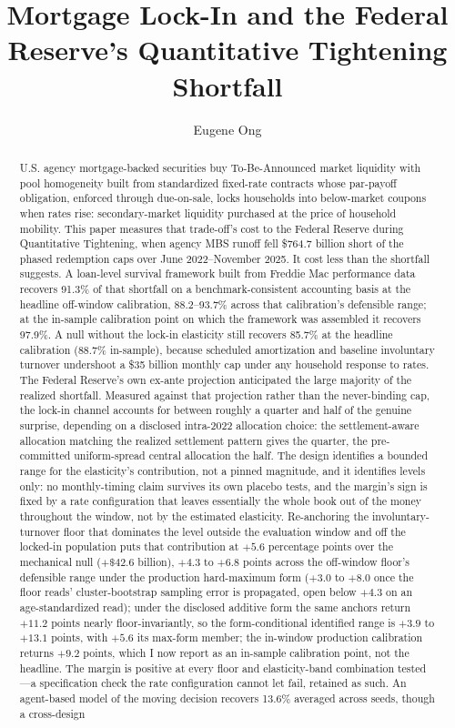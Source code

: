 \documentclass[12pt]{article}
\title{Mortgage Lock-In and the Federal Reserve's Quantitative Tightening Shortfall}
\author{Eugene Ong}
\affil{Carnegie Mellon University}
\date{}
\begin{document}
\maketitle
\begin{abstract}
\noindent U.S. agency mortgage-backed securities buy To-Be-Announced market liquidity with pool homogeneity built from standardized fixed-rate contracts whose par-payoff obligation, enforced through due-on-sale, locks households into below-market coupons when rates rise: secondary-market liquidity purchased at the price of household mobility. This paper measures that trade-off's cost to the Federal Reserve during Quantitative Tightening, when agency MBS runoff fell \$764.7 billion short of the phased redemption caps over June 2022--November 2025. It cost less than the shortfall suggests. A loan-level survival framework built from Freddie Mac performance data recovers 91.3\% of that shortfall on a benchmark-consistent accounting basis at the headline off-window calibration, 88.2--93.7\% across that calibration's defensible range; at the in-sample calibration point on which the framework was assembled it recovers 97.9\%. A null without the lock-in elasticity still recovers 85.7\% at the headline calibration (88.7\% in-sample), because scheduled amortization and baseline involuntary turnover undershoot a \$35 billion monthly cap under any household response to rates. The Federal Reserve's own ex-ante projection anticipated the large majority of the realized shortfall. Measured against that projection rather than the never-binding cap, the lock-in channel accounts for between roughly a quarter and half of the genuine surprise, depending on a disclosed intra-2022 allocation choice: the settlement-aware allocation matching the realized settlement pattern gives the quarter, the pre-committed uniform-spread central allocation the half. The design identifies a bounded range for the elasticity's contribution, not a pinned magnitude, and it identifies levels only: no monthly-timing claim survives its own placebo tests, and the margin's sign is fixed by a rate configuration that leaves essentially the whole book out of the money throughout the window, not by the estimated elasticity. Re-anchoring the involuntary-turnover floor that dominates the level outside the evaluation window and off the locked-in population puts that contribution at $+5.6$ percentage points over the mechanical null ($+\$42.6$ billion), $+4.3$ to $+6.8$ points across the off-window floor's defensible range under the production hard-maximum form ($+3.0$ to $+8.0$ once the floor reads' cluster-bootstrap sampling error is propagated, open below $+4.3$ on an age-standardized read); under the disclosed additive form the same anchors return $+11.2$ points nearly floor-invariantly, so the form-conditional identified range is $+3.9$ to $+13.1$ points, with $+5.6$ its max-form member; the in-window production calibration returns $+9.2$ points, which I now report as an in-sample calibration point, not the headline. The margin is positive at every floor and elasticity-band combination tested---a specification check the rate configuration cannot let fail, retained as such. An agent-based model of the moving decision recovers 13.6\% averaged across seeds, though a cross-design 
\end{abstract}
\end{document}

